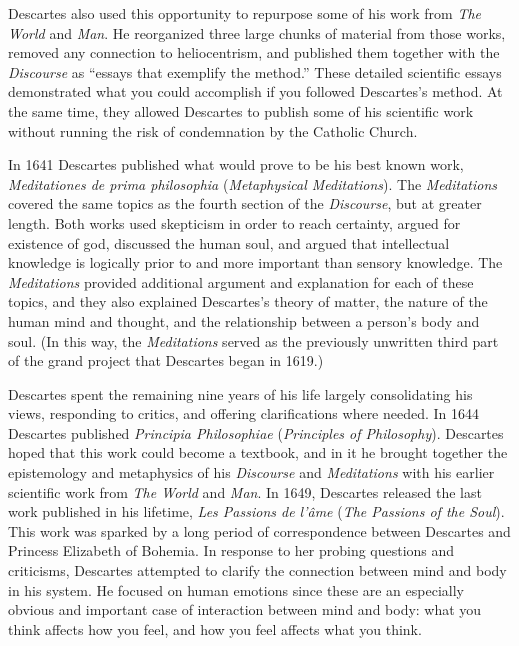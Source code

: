 Descartes also used this opportunity to repurpose some of his work from \textit{The World} and \textit{Man}. He reorganized three large chunks of material from those works, removed any connection to heliocentrism, and published them together with the \textit{Discourse} as ``essays that exemplify the method.'' These detailed scientific essays demonstrated what you could accomplish if you followed Descartes's method. At the same time, they allowed Descartes to publish some of his scientific work without running the risk of condemnation by the Catholic Church.

In 1641 Descartes published what would prove to be his best known work, \textit{Meditationes de prima philosophia} (\textit{Metaphysical Meditations}). The \textit{Meditations} covered the same topics as the fourth section of the \textit{Discourse}, but at greater length. Both works used skepticism in order to reach certainty, argued for existence of god, discussed the human soul, and argued that intellectual knowledge is logically prior to and more important than sensory knowledge. The \textit{Meditations} provided additional argument and explanation for each of these topics, and they also explained Descartes's theory of matter, the nature of the human mind and thought, and the relationship between a person's body and soul. (In this way, the \textit{Meditations} served as the previously unwritten third part of the grand project that Descartes began in 1619.)

Descartes spent the remaining nine years of his life largely consolidating his views, responding to critics, and offering clarifications where needed. In 1644 Descartes published \textit{Principia Philosophiae} (\textit{Principles of Philosophy}). Descartes hoped that this work could become a textbook, and in it he brought together the epistemology and metaphysics of his \textit{Discourse} and \textit{Meditations} with his earlier scientific work from \textit{The World} and \textit{Man}. In 1649, Descartes released the last work published in his lifetime, \textit{Les Passions de l'âme} (\textit{The Passions of the Soul}). This work was sparked by a long period of correspondence between Descartes and Princess Elizabeth of Bohemia. In response to her probing questions and criticisms, Descartes attempted to clarify the connection between mind and body in his system. He focused on human emotions since these are an especially obvious and important case of interaction between mind and body: what you think affects how you feel, and how you feel affects what you think.

